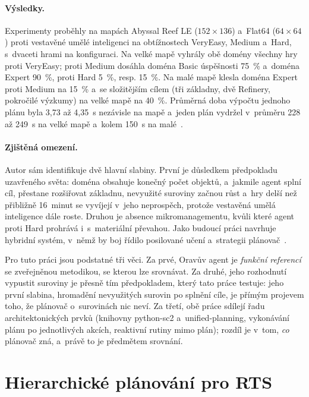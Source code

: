 \paragraph{Výsledky.} Experimenty proběhly na mapách Abyssal Reef LE ($152 \times 136$) a~Flat64 ($64 \times 64$) proti vestavěné umělé inteligenci na obtížnostech VeryEasy, Medium a~Hard, s~dvaceti hrami na konfiguraci. Na velké mapě vyhrály obě domény všechny hry proti VeryEasy; proti Medium dosáhla doména Basic úspěšnosti 75~\% a~doména Expert 90~\%, proti Hard 5~\%, resp. 15~\%. Na malé mapě klesla doména Expert proti Medium na 15~\% a~se složitějším cílem (tři základny, dvě Refinery, pokročilé výzkumy) na velké mapě na 40~\%. Průměrná doba výpočtu jednoho plánu byla 3,73 až 4,35~s nezávisle na mapě a~jeden plán vydržel v~průměru 228 až 249~s na velké mapě a~kolem 150~s na malé~\cite[kap.~6]{Orava2025}.

\paragraph{Zjištěná omezení.} Autor sám identifikuje dvě hlavní slabiny. První je důsledkem předpokladu uzavřeného světa: doména obsahuje konečný počet objektů, a~jakmile agent splní cíl, přestane rozšiřovat základnu, nevyužité suroviny začnou růst a~hry delší než přibližně 16~minut se vyvíjejí v~jeho neprospěch, protože vestavěná umělá inteligence dále roste. Druhou je absence mikromanagementu, kvůli které agent proti Hard prohrává i~s~materiální převahou. Jako budoucí práci navrhuje hybridní systém, v~němž by boj řídilo posilované učení a~strategii plánovač~\cite[kap.~7]{Orava2025}.

Pro tuto práci jsou podstatné tři věci. Za prvé, Oravův agent je \emph{funkční referencí} se zveřejněnou metodikou, se kterou lze srovnávat. Za druhé, jeho rozhodnutí vypustit suroviny je přesně tím předpokladem, který tato práce testuje: jeho první slabina, hromadění nevyužitých surovin po splnění cíle, je přímým projevem toho, že plánovač o~surovinách nic neví. Za třetí, obě práce sdílejí řadu architektonických prvků (knihovny python-sc2 a~unified-planning, vykonávání plánu po jednotlivých akcích, reaktivní rutiny mimo plán); rozdíl je v~tom, \emph{co} plánovač zná, a~právě to je předmětem srovnání.

\section{Hierarchické plánování pro RTS}
\label{sec:kamenik}

